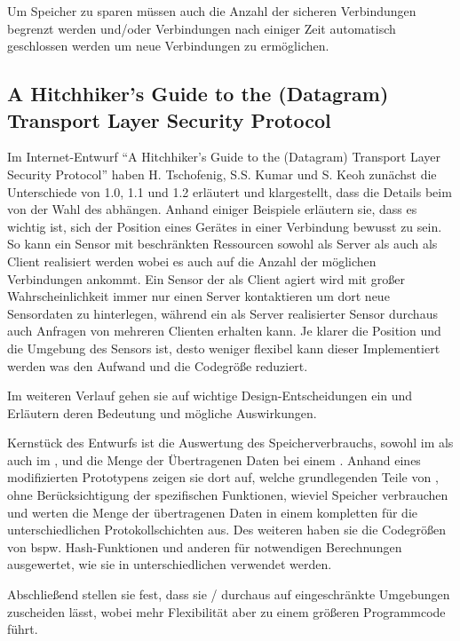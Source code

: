 Um Speicher zu sparen müssen auch die Anzahl der sicheren Verbindungen begrenzt werden und/oder Verbindungen nach einiger Zeit
automatisch geschlossen werden um neue Verbindungen zu ermöglichen.

\subsection{A Hitchhiker's Guide to the (Datagram) Transport Layer Security Protocol}
Im Internet-Entwurf "`A Hitchhiker's Guide to the (Datagram) Transport Layer Security Protocol"' \cite{draftmintls} haben H. Tschofenig, S.S. Kumar
und S. Keoh zunächst die Unterschiede von  1.0, 1.1 und 1.2 erläutert und klargestellt, dass die Details beim  von der Wahl des
 abhängen. Anhand einiger Beispiele erläutern sie, dass es wichtig ist, sich der Position eines Gerätes in einer Verbindung bewusst zu sein.
So kann ein Sensor mit beschränkten Ressourcen sowohl als Server als auch als Client realisiert werden wobei es auch auf die Anzahl der möglichen
Verbindungen ankommt. Ein Sensor der als Client agiert wird mit großer Wahrscheinlichkeit immer nur einen Server kontaktieren um dort neue Sensordaten
zu hinterlegen, während ein als Server realisierter Sensor durchaus auch Anfragen von mehreren Clienten erhalten kann. Je klarer die Position und die
Umgebung des Sensors ist, desto weniger flexibel kann dieser Implementiert werden was den Aufwand und die Codegröße reduziert.

Im weiteren Verlauf gehen sie auf wichtige Design-Entscheidungen ein und Erläutern deren Bedeutung und mögliche Auswirkungen.

Kernstück des Entwurfs ist die Auswertung des Speicherverbrauchs, sowohl im  als auch im , und die Menge der Übertragenen Daten bei einem .
Anhand eines modifizierten Prototypens zeigen sie dort auf, welche grundlegenden Teile von , ohne Berücksichtigung der  spezifischen Funktionen,
wieviel Speicher verbrauchen und werten die Menge der übertragenen Daten in einem kompletten  für die unterschiedlichen Protokollschichten aus.
Des weiteren haben sie die Codegrößen von bspw. Hash-Funktionen und anderen für  notwendigen Berechnungen ausgewertet, wie sie in unterschiedlichen
 verwendet werden.

Abschließend stellen sie fest, dass sie / durchaus auf eingeschränkte Umgebungen zuscheiden lässt, wobei mehr Flexibilität aber zu einem
größeren Programmcode führt.

